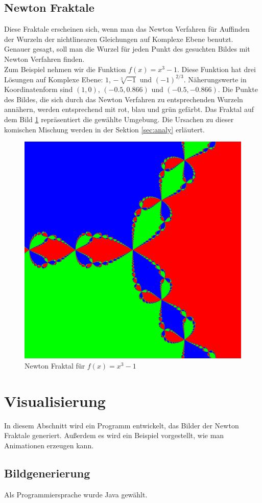 \documentclass[a4paper,12pt]{llncs}
\numberwithin{equation}{section}
\begin{document}
\subsection{Newton Fraktale}
Diese Fraktale erscheinen sich, wenn man das Newton Verfahren für Auffinden der Wurzeln der nichtlinearen Gleichungen auf Komplexe Ebene benutzt.
Genauer gesagt, soll man die Wurzel für jeden Punkt des gesuchten Bildes mit Newton Verfahren finden.\\
Zum Beispiel nehmen wir die Funktion $f(x) = x^3 -1$. Diese Funktion hat drei Lösungen auf Komplexe Ebene: $1$, $-\sqrt[3]{-1}$ und $(-1)^{2/3}$. Näherungswerte in Koordinatenform sind $(1, 0)$, $(-0.5, 0.866)$ und $(-0.5, -0.866)$. Die Punkte des Bildes, die sich durch das Newton Verfahren zu entsprechenden Wurzeln annähern, werden entsprechend mit rot, blau und grün gefärbt.
Das Fraktal auf dem Bild \ref{fig:output3_0} repräsentiert die gewählte Umgebung.
Die Ursachen zu dieser komischen Mischung werden in der Sektion \ref{sec:analy} erläutert.
\begin{figure}[ht]   
		\centering
		\includegraphics[width=.6\linewidth]{figures/output3_0}
		\caption{Newton Fraktal für $f(x)=x^3-1$ }
		\label{fig:output3_0}
\end{figure}
\section{Visualisierung}\label{sec:vis}
In diesem Abschnitt wird ein Programm entwickelt, das Bilder der Newton Fraktale generiert.
Außerdem es wird ein Beispiel vorgestellt, wie man Animationen erzeugen kann.
\subsection{Bildgenerierung}\label{subs:vis:bild}
Als Programmiersprache wurde Java gewählt.
\end{document}
